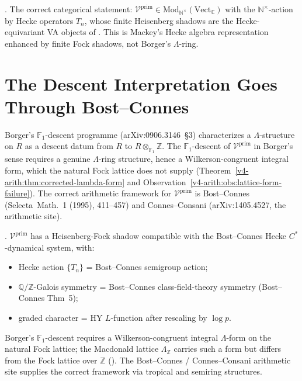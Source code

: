 \begin{corollary}
\label{v4-arith:cor:psi-ring-hecke}
\ClaimStatusProvedHere. The correct categorical statement:
\(\mathcal{V}^{\mathrm{prim}}\in\mathrm{Mod}_{\mathbb{N}^{\times}}(\mathrm{Vect}_{\mathbb{C}})\)
with the \(\mathbb{N}^{\times}\)-action by Hecke operators \(T_{n}\),
whose finite Heisenberg shadows are the Hecke-equivariant VA objects of
. This is Mackey's Hecke algebra
representation enhanced by finite Fock shadows, not Borger's
\(\Lambda\)-ring.
\end{corollary}

\section{The Descent Interpretation Goes Through Bost--Connes}
\label{v4-arith:gb:descent-bost-connes}

\begin{remark}
Borger's \(\mathbb{F}_{1}\)-descent programme (arXiv:0906.3146~\S3)
characterizes a \(\Lambda\)-structure on \(R\) as a descent datum from \(R\) to
\(R\otimes_{\mathbb{F}_{1}}\mathbb{Z}\). The \(\mathbb{F}_{1}\)-descent of
\(\mathcal{V}^{\mathrm{prim}}\) in Borger's sense requires a genuine
\(\Lambda\)-ring structure, hence a Wilkerson-congruent integral form, which
the natural Fock lattice does not supply (Theorem~\ref{v4-arith:thm:corrected-lambda-form}
and Observation~\ref{v4-arith:obs:lattice-form-failure}). The correct
arithmetic framework for \(\mathcal{V}^{\mathrm{prim}}\) is
Bost--Connes (Selecta~Math.~1 (1995), 411--457) and Connes--Consani
(arXiv:1405.4527, the arithmetic site).
\end{remark}

\begin{theorem}
\label{v4-arith:thm:bost-connes-descent}
\ClaimStatusConjectured. \(\mathcal{V}^{\mathrm{prim}}\) has a
Heisenberg-Fock shadow compatible with the Bost--Connes Hecke
\(C^{*}\)-dynamical system, with:
\begin{itemize}
\item Hecke action \(\{T_{n}\}\) = Bost--Connes semigroup action;
\item \(\mathbb{Q}/\mathbb{Z}\)-Galois symmetry = Bost--Connes
class-field-theory symmetry (Bost--Connes Thm~5);
\item graded character = HY \(L\)-function after rescaling by
\(\log p\).
\end{itemize}
Borger's \(\mathbb{F}_{1}\)-descent requires a Wilkerson-congruent
integral \(\Lambda\)-form on the natural Fock lattice; the Macdonald
lattice \(\Lambda_{\mathbb{Z}}\) carries such a form but differs from
the Fock lattice over \(\mathbb{Z}\)
(). The Bost--Connes /
Connes--Consani arithmetic site supplies the correct framework via
tropical and semiring structures.
\end{theorem}

